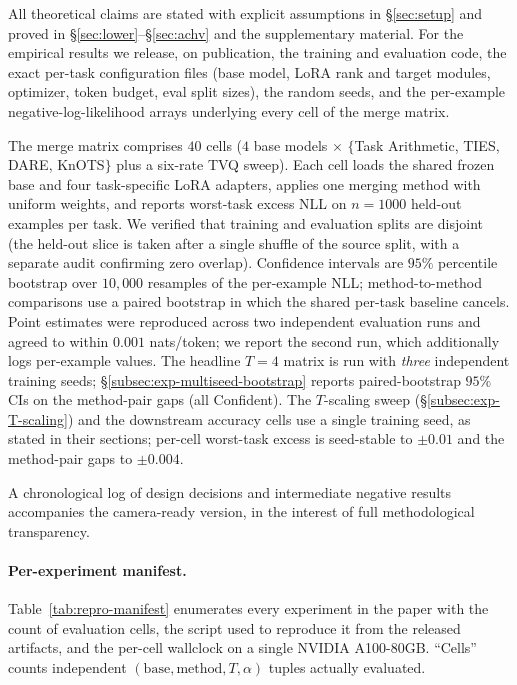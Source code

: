 
All theoretical claims are stated with explicit assumptions in
\S\ref{sec:setup} and proved in \S\ref{sec:lower}--\S\ref{sec:achv}
and the supplementary material. For the empirical results we
release, on publication, the training and evaluation code, the
exact per-task configuration files (base model, LoRA rank and
target modules, optimizer, token budget, eval split sizes), the
random seeds, and the per-example negative-log-likelihood arrays
underlying every cell of the merge matrix.

The merge matrix comprises $40$ cells ($4$ base models $\times$
$\{$Task Arithmetic, TIES, DARE, KnOTS$\}$ plus a six-rate TVQ
sweep). Each cell loads the shared frozen base and four
task-specific LoRA adapters, applies one merging method with
uniform weights, and reports worst-task excess NLL on $n=1000$
held-out examples per task. We verified that training and
evaluation splits are disjoint (the held-out slice is taken
after a single shuffle of the source split, with a separate
audit confirming zero overlap). Confidence intervals are $95\%$
percentile bootstrap over $10{,}000$ resamples of the
per-example NLL; method-to-method comparisons use a paired
bootstrap in which the shared per-task baseline cancels.
Point estimates were reproduced across two independent
evaluation runs and agreed to within $0.001$ nats/token; we
report the second run, which additionally logs per-example
values. The headline $T = 4$ matrix is run with \emph{three}
independent training seeds; \S\ref{subsec:exp-multiseed-bootstrap}
reports paired-bootstrap $95\%$ CIs on the method-pair gaps (all
Confident). The $T$-scaling sweep (\S\ref{subsec:exp-T-scaling}) and
the downstream accuracy cells use a single training seed, as stated in
their sections; per-cell worst-task excess is seed-stable to
$\pm 0.01$ and the method-pair gaps to $\pm 0.004$.

A chronological log of design decisions and intermediate negative
results accompanies the camera-ready version, in the interest of full
methodological transparency.

\paragraph{Per-experiment manifest.}
Table~\ref{tab:repro-manifest} enumerates every experiment in the
paper with the count of evaluation cells, the script used to
reproduce it from the released artifacts, and the per-cell wallclock
on a single NVIDIA A100-80GB. ``Cells'' counts independent
$(\text{base}, \text{method}, \text{$T$}, \alpha)$ tuples actually
evaluated.


